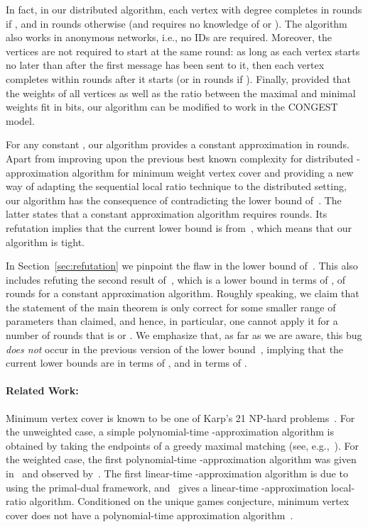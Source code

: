 \documentclass[11pt]{article}
\begin{document}
In fact, in our distributed algorithm, each vertex  with degree  completes in  rounds if , and in  rounds otherwise (and requires no knowledge of  or ). The algorithm also works in anonymous networks, i.e., no IDs are required. Moreover, the vertices are not required to start at the same round: as long as each vertex starts no later than after the first message has been sent to it, then each vertex completes within  rounds after it starts (or in  rounds if ).
Finally, provided that the weights of all vertices as well as the ratio between the maximal and minimal weights fit in  bits, our algorithm can be modified to work in the CONGEST model.

For any constant , our algorithm provides a constant approximation in  rounds. Apart from improving upon the previous best known complexity for distributed -approximation algorithm for minimum weight vertex cover and providing a new way of adapting the sequential local ratio technique to the distributed setting, our algorithm has the consequence of contradicting the lower bound of~\cite{KMW10}. The latter states that a constant approximation algorithm requires  rounds. Its refutation implies that the current lower bound is  from~\cite{KMW04}, which means that our algorithm is tight.

In Section~\ref{sec:refutation} we pinpoint the flaw in the lower bound of~\cite{KMW10}. This also includes refuting the second result of~\cite{KMW10}, which is a lower bound in terms of , of  rounds for a constant approximation algorithm. Roughly speaking, we claim that the statement of the main theorem is only correct for some smaller range of parameters than claimed, and hence, in particular, one cannot apply it for a number of rounds that is  or .
We emphasize that, as far as we are aware, this bug \emph{does not} occur in the previous version of the lower bound~\cite{KMW04}, implying that the current lower bounds are  in terms of , and  in terms of .

\paragraph{Related Work:}
Minimum vertex cover is known to be one of Karp's 21 NP-hard problems~\cite{Karp72}. For the unweighted case, a simple polynomial-time -approximation algorithm is obtained by taking the endpoints of a greedy maximal matching (see, e.g.,~\cite{Cormen2009,GareyJ79}). For the weighted case, the first polynomial-time -approximation algorithm was given in~\cite{NemhauserT75} and observed by~\cite{Hochbaum82}. The first linear-time -approximation algorithm is due to~\cite{BarYehudaE81} using the primal-dual framework, and~\cite{BarYehudaE1985} gives a linear-time -approximation local-ratio algorithm. Conditioned on the unique games conjecture, minimum vertex cover does not have a  polynomial-time approximation algorithm~\cite{KhotR08}.
\end{document}
